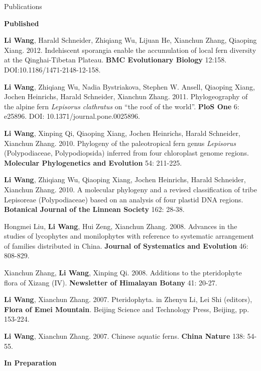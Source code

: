 \documentclass{resume} %
\begin{document}
\begin{rSection}{Publications}{}{}
\begin{rSubsection}{\textbf{Published}}{}{}{}
\item \textbf{Li Wang}, Harald Schneider, Zhiqiang Wu, Lijuan He, Xianchun Zhang, Qiaoping Xiang. 2012. Indehiscent sporangia enable the accumulation of local fern diversity at the Qinghai-Tibetan Plateau. \textbf{BMC Evolutionary Biology} 12:158. DOI:10.1186/1471-2148-12-158.

\item \textbf{Li Wang}, Zhiqiang Wu, Nadia Bystriakova, Stephen W. Ansell, Qiaoping Xiang, Jochen Heinrichs, Harald Schneider, Xianchun Zhang. 2011. Phylogeography of the alpine fern \textit{Lepisorus clathratus} on “the roof of the world”. \textbf{PloS One} 6: e25896. DOI: 10.1371/journal.pone.0025896. 

\item \textbf{Li Wang}, Xinping Qi, Qiaoping Xiang, Jochen Heinrichs, Harald Schneider, Xianchun Zhang. 2010. Phylogeny of the paleotropical fern genus \textit{Lepisorus} (Polypodiaceae, Polypodiopsida) inferred from four chloroplast genome regions. \textbf{Molecular Phylogenetics and Evolution} 54: 211-225. 

\item \textbf{Li Wang}, Zhiqiang Wu, Qiaoping Xiang, Jochen Heinrichs, Harald Schneider, Xianchun Zhang. 2010. A molecular phylogeny and a revised classification of tribe Lepisoreae (Polypodiaceae) based on an analysis of four plastid DNA regions. \textbf{Botanical Journal of the Linnean Society} 162: 28-38. 

\item Hongmei Liu, \textbf{Li Wang}, Hui Zeng, Xianchun Zhang. 2008. Advances in the studies of lycophytes and monilophytes with reference to systematic arrangement of families distributed in China. \textbf{Journal of Systematics and Evolution} 46: 808-829. 

\item Xianchun Zhang, \textbf{Li Wang}, Xinping Qi. 2008. Additions to the pteridophyte flora of Xizang (IV). \textbf{Newsletter of Himalayan Botany} 41: 20-27. 
 
\item \textbf{Li Wang}, Xianchun Zhang. 2007. Pteridophyta. in Zhenyu Li, Lei Shi (editors), \textbf{Flora of Emei Mountain}. Beijing Science and Technology Press, Beijing, pp. 153-224. 

\item \textbf{Li Wang}, Xianchun Zhang. 2007. Chinese aquatic ferns. \textbf{China Nature} 138: 54-55. 


\end{rSubsection}
\begin{rSubsection}{\textbf{In Preparation}}{}{}{}


\end{rSubsection}
\end{rSection}
\end{document}
